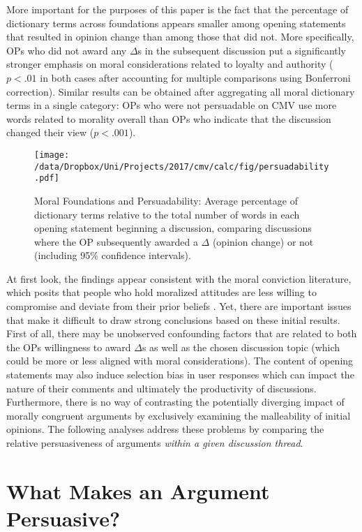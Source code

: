 More important for the purposes of this paper is the fact that the percentage of dictionary terms across foundations appears smaller among opening statements that resulted in opinion change than among those that did not. More specifically, OPs who did not award any $\Delta$s in the subsequent discussion put a significantly stronger emphasis on moral considerations related to loyalty and authority ($p<.01$ in both cases after accounting for multiple comparisons using Bonferroni correction). Similar results can be obtained after aggregating all moral dictionary terms in a single category: OPs who were not persuadable on CMV use more words related to morality overall than OPs who indicate that the discussion changed their view ($p<.001$).

\begin{figure}[ht]
\centering
\texttt{[image: /data/Dropbox/Uni/Projects/2017/cmv/calc/fig/persuadability.pdf]}
\caption[Moral Foundations and Persuadability]{Moral Foundations and Persuadability: Average percentage of dictionary terms relative to the total number of words in each opening statement beginning a discussion, comparing discussions where the OP subsequently awarded a $\Delta$ (opinion change) or not (including 95\% confidence intervals).}\label{fig:persuadability}
\end{figure}

At first look, the findings appear consistent with the moral conviction literature, which posits that people who hold moralized attitudes are less willing to compromise and deviate from their prior beliefs \citep[e.g.,][]{skitka2005moral,ryan2014reconsidering,ryan2017no}. Yet, there are important issues that make it difficult to draw strong conclusions based on these initial results. First of all, there may be unobserved confounding factors that are related to both the OPs willingness to award $\Delta$s as well as the chosen discussion topic (which could be more or less aligned with moral considerations). The content of opening statements may also induce selection bias in user responses which can impact the nature of their comments and ultimately the productivity of discussions. Furthermore, there is no way of contrasting the potentially diverging impact of morally congruent arguments by exclusively examining the malleability of initial opinions. The following analyses address these problems by comparing the relative persuasiveness of arguments \textit{within a given discussion thread}.


\clearpage
\section{What Makes an Argument Persuasive?}

